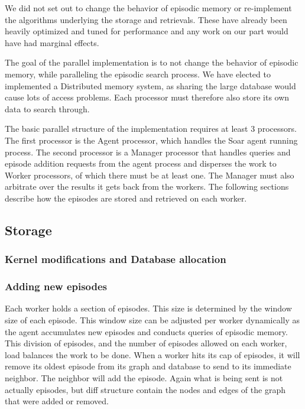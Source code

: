 \documentclass[11pt]{article} %
\begin{document}
We did not set out to change the behavior of episodic memory or re-implement the
algorithms underlying the storage and retrievals. These have already been
heavily optimized and tuned for performance and any work on our part would have
had marginal effects.




The goal of the parallel implementation is to not change the behavior of
episodic memory, while paralleling the episodic search process. We have elected
to implemented a Distributed memory system, as sharing the large database would
cause lots of access problems. Each processor must therefore also store its own
data to search through.

The basic parallel structure of the implementation requires at least 3
processors. The first processor is the Agent processor, which handles the Soar
agent running process. The second processor is a Manager processor that handles
queries and episode addition requests from the agent process and disperses the
work to Worker processors, of which there must be at least one. The Manager must
also arbitrate over the results it gets back from the workers. The following
sections describe how the episodes are stored and retrieved on each worker.

\subsection{Storage}

\subsubsection{Kernel modifications and Database allocation}

\subsubsection{Adding new episodes}

Each worker holds a section of episodes. This size is determined by the window
size of each episode. This window size can be adjusted per worker dynamically as
the agent accumulates new episodes and conducts queries of episodic memory. This
division of episodes, and the number of episodes allowed on each worker, load
balances the work to be done. When a worker hits its cap of episodes, it will
remove its oldest episode from its graph and database to send to its immediate
neighbor. The neighbor will add the episode. Again what is being sent is not
actually episodes, but diff structure contain the nodes and edges of the graph
that were added or removed.
\end{document}
